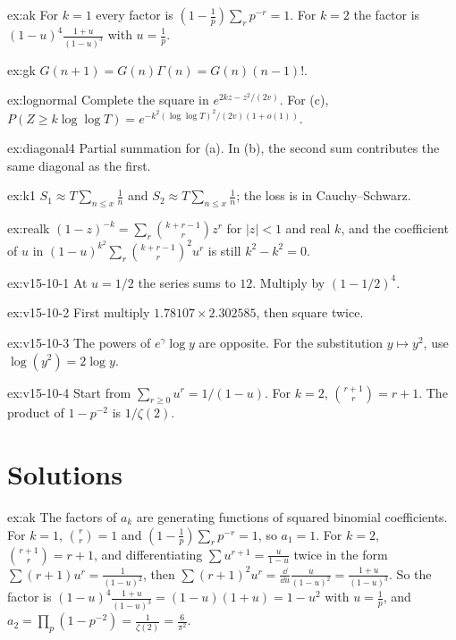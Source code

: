 \begin{hint}{ex:ak}
For $k=1$ every factor is $(1-\frac1p)\sum_rp^{-r}=1$. For $k=2$ the factor is $(1-u)^4\frac{1+u}{(1-u)^3}$ with $u=\frac1p$.
\end{hint}
\begin{hint}{ex:gk}
$G(n+1)=G(n)\Gamma(n)=G(n)(n-1)!$.
\end{hint}
\begin{hint}{ex:lognormal}
Complete the square in $e^{2kz-z^2/(2v)}$. For (c), $P(Z\ge k\log\log T)=e^{-k^2(\log\log T)^2/(2v)(1+o(1))}$.
\end{hint}
\begin{hint}{ex:diagonal4}
Partial summation for (a). In (b), the second sum contributes the same diagonal as the first.
\end{hint}
\begin{hint}{ex:k1}
$S_1\approx T\sum_{n\le x}\frac1n$ and $S_2\approx T\sum_{n\le x}\frac1n$; the loss is in Cauchy--Schwarz.
\end{hint}
\begin{hint}{ex:realk}
$(1-z)^{-k}=\sum_r\binom{k+r-1}rz^r$ for $|z|<1$ and real $k$, and the coefficient of $u$ in $(1-u)^{k^2}\sum_r\binom{k+r-1}r^2u^r$ is still $k^2-k^2=0$.
\end{hint}

\begin{hint}{ex:v15-10-1}
At \(u=1/2\) the series sums to \(12\). Multiply by \((1-1/2)^4\).
\end{hint}

\begin{hint}{ex:v15-10-2}
First multiply \(1.78107\times2.302585\), then square twice.
\end{hint}

\begin{hint}{ex:v15-10-3}
The powers of \(e^{\gamma}\log y\) are opposite. For the substitution \(y\mapsto y^2\), use \(\log(y^2)=2\log y\).
\end{hint}

\begin{hint}{ex:v15-10-4}
Start from \(\sum_{r\ge0}u^r=1/(1-u)\). For \(k=2\), \(\binom{r+1}{r}=r+1\). The product of \(1-p^{-2}\) is \(1/\zeta(2)\).
\end{hint}

\section{Solutions}

\begin{solution}{ex:ak}
\idea The factors of $a_k$ are generating functions of squared binomial coefficients.
\writeup For $k=1$, $\binom r r=1$ and $(1-\frac1p)\sum_rp^{-r}=1$, so $a_1=1$. For $k=2$, $\binom{r+1}r=r+1$, and differentiating $\sum u^{r+1}=\frac u{1-u}$ twice in the form $\sum(r+1)u^r=\frac1{(1-u)^2}$, then $\sum(r+1)^2u^r=\frac{\dd}{\dd u}\frac u{(1-u)^2}=\frac{1+u}{(1-u)^3}$. So the factor is $(1-u)^4\frac{1+u}{(1-u)^3}=(1-u)(1+u)=1-u^2$ with $u=\frac1p$, and $a_2=\prod_p(1-p^{-2})=\frac1{\zeta(2)}=\frac6{\pi^2}$.
\end{solution}

